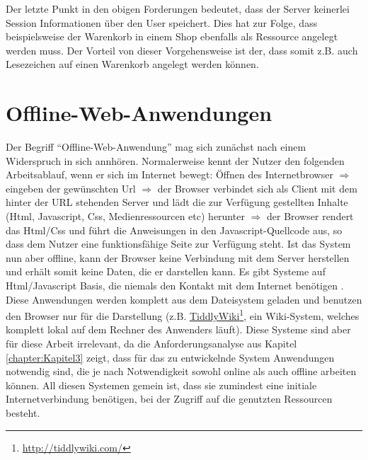 Der letzte Punkt in den obigen Forderungen bedeutet, dass der Server keinerlei Session Informationen über den User speichert. Dies hat zur Folge, dass beispielsweise der Warenkorb in einem Shop ebenfalls als Ressource angelegt werden muss. Der Vorteil von dieser Vorgehensweise ist der, dass somit z.B. auch Lesezeichen auf einen Warenkorb angelegt werden können.
 
\section{Offline-Web-Anwendungen}
Der Begriff "`Offline-Web-Anwendung"' mag sich zunächst nach einem Widerspruch in sich annhören. Normalerweise kennt der Nutzer den folgenden Arbeitsablauf, wenn er sich im Internet bewegt: Öffnen des Internetbrowser $\Rightarrow$ eingeben der gewünschten Url $\Rightarrow$ der Browser verbindet sich als Client mit dem hinter der URL stehenden Server und lädt die zur Verfügung gestellten Inhalte (Html, Javascript, Css, Medienressourcen etc) herunter $\Rightarrow$ der Browser rendert das Html/Css und führt die Anweisungen in den Javascript-Quellcode aus, so dass dem Nutzer eine funktionsfähige Seite zur Verfügung steht. Ist das System nun aber offline, kann der Browser keine Verbindung mit dem Server herstellen und erhält somit keine Daten, die er darstellen kann. Es gibt Systeme auf Html/Javascript Basis, die niemals den Kontakt mit dem Internet benötigen \cite{Mahemoff22010}. Diese Anwendungen werden komplett aus dem Dateisystem geladen und benutzen den Browser nur für die Darstellung (z.B. \href{http://tiddlywiki.com}{TiddlyWiki}\footnote{\url{http://tiddlywiki.com/}}, ein Wiki-System, welches komplett lokal auf dem Rechner des Anwenders läuft). Diese Systeme sind aber für diese Arbeit irrelevant, da die Anforderungsanalyse aus Kapitel \ref{chapter:Kapitel3} zeigt, dass für das zu entwickelnde System Anwendungen notwendig sind, die je nach Notwendigkeit sowohl online als auch offline arbeiten können. All diesen Systemen gemein ist, dass sie zumindest eine initiale Internetverbindung benötigen, bei der Zugriff auf die genutzten Ressourcen besteht.

